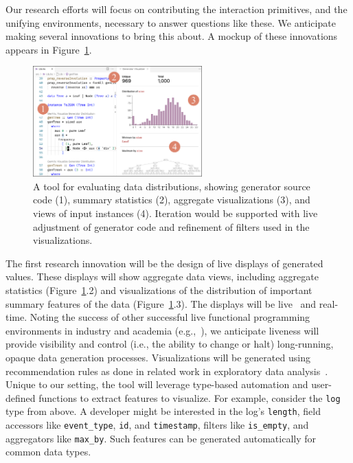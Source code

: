 Our research efforts will focus on contributing the interaction primitives, and 
the unifying environments, necessary to answer questions like these. We 
anticipate making several innovations to bring this about. A mockup of these 
innovations appears in Figure~\ref{fig:gen-vis}.

\begin{figure}
  \centering
  \includegraphics[width=0.58\textwidth]{assets/gen-vis.pdf}
  \caption{A tool for evaluating data distributions, showing
  generator source code (1), summary statistics (2),
  aggregate visualizations (3), and views of input instances
  (4). Iteration would be supported with live adjustment of
  generator code and refinement of filters used in the
  visualizations.}\label{fig:gen-vis}
\end{figure}

The first research innovation will be the design of live displays of generated 
values. These displays
will show aggregate data views, including aggregate
statistics (Figure~\ref{fig:gen-vis}.2) and visualizations of the distribution
of important summary features of the data (Figure~\ref{fig:gen-vis}.3). The 
displays will be live~\cite{ref:tanimoto1990viva} and real-time. Noting the 
success of other successful live functional programming environments in industry 
and academia
(e.g.,~\cite{tool:lighttable,ref:omar2019live}), we anticipate liveness will 
provide visibility and control (i.e., the ability to change or halt)
long-running, opaque data generation processes.  Visualizations will be
generated using recommendation rules as done in related work in exploratory data 
analysis~\cite{ref:lee2021lux,wongsuphasawat_voyager_2016,
wongsuphasawat_voyager_2017}. Unique to our setting, the tool will leverage
type-based automation and user-defined functions to extract features to 
visualize.
For example, consider the
\lstinline{log} type
from above. A developer might be interested in the log's
\lstinline{length}, field accessors like \lstinline{event_type}, \lstinline{id},
and \lstinline{timestamp}, filters like \lstinline{is_empty}, and
aggregators like \lstinline{max_by}. Such features can be
generated automatically for common data types.

